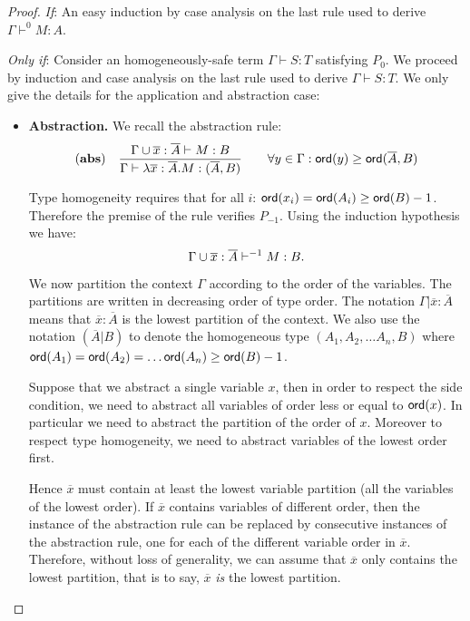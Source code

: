 \begin{proof}
\emph{If}: An easy induction by case analysis on the last rule used to derive $\Gamma \vdash^0 M : A$.

\emph{Only if}:
Consider an homogeneously-safe term $\Gamma \vdash S : T$ satisfying $P_0$.
We proceed by induction and case analysis on the last rule used to derive $\Gamma \vdash S : T$.
We only give the details for the application and abstraction
case:
\begin{itemize}
\item \textbf{Abstraction.} We recall the abstraction rule:
$$ \mathbf{(abs)} \quad  \frac{\displaystyle \Gamma \cup \overline{x} : \overline{A} \vdash M : B}{\Gamma  \vdash \lambda \overline{x} : \overline{A} . M : (\overline{A},B)} \qquad
                                   \forall y \in \Gamma : {\sf ord}(y) \geq {\sf ord}(\overline{A},B)$$

Type homogeneity requires that for all $i$: ${\sf ord}(x_i) = {\sf ord}(A_i) \geq
{\sf ord}(B) -1$. Therefore the premise of the rule verifies $P_{-1}$. Using the induction hypothesis we have:
\begin{equation}
\Gamma \cup \overline{x} : \overline{A} \vdash^{-1} M : B. \label{eq:prop:nonhomogsafe_homog_restriction:abs1}
\end{equation}

We now partition the context $\Gamma$ according to the order of
the variables. The partitions are written in decreasing order of
type order. The notation $\Gamma | \overline{x}:\overline{A}$ means
that $\overline{x}:\overline{A}$ is the lowest partition of the
context.
We also use the notation $(\overline{A}|B)$ to denote the
homogeneous type $(A_1, A_2, \ldots A_n, B)$ where ${\sf ord}(A_1) =
{\sf ord}(A_2) =  \ldots {\sf ord}(A_n) \geq {\sf ord}(B) -1$.


Suppose that we abstract a single variable $x$, then in order to
respect the side condition, we need to abstract all variables of
order less or equal to ${\sf ord}(x)$. In particular we need to abstract
the partition of the order of $x$. Moreover to respect type
homogeneity, we need to abstract variables of the lowest order
first.

Hence $\overline{x}$ must contain at least the lowest variable
partition (all the variables of the lowest order). If $\overline{x}$
contains variables of different order, then the instance of the
abstraction rule can be replaced by consecutive instances of the
abstraction rule, one for each of the different variable order in
$\overline{x}$. Therefore, without loss of generality, we can assume
that $\overline{x}$ only contains the lowest partition, that is to
say, $\overline{x}$ \emph{is} the lowest partition.


\end{itemize}
\end{proof}
